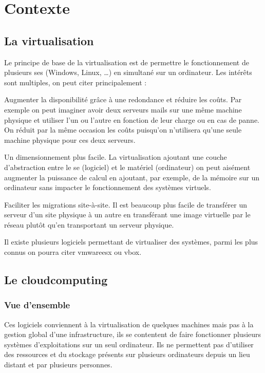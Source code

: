 \documentclass[a4paper,oneside]{report}
\begin{document}
\section{Contexte}
\subsection{La \gls{virtualisation}}
Le principe de base de la \gls{virtualisation} est de permettre le fonctionnement de plusieurs \glspl{se} (Windows, Linux, …) en simultané sur un ordinateur.
Les intérêts sont multiples, on peut citer principalement :\newline

Augmenter la disponibilité grâce à une redondance et réduire les coûts.
Par exemple on peut imaginer avoir deux serveurs mails sur une même machine physique et utiliser l’un ou l’autre en fonction de leur charge ou en cas de panne.
On réduit par la même occasion les coûts puisqu’on n’utilisera qu’une seule machine physique pour ces deux serveurs.

Un dimensionnement plus facile. La \gls{virtualisation} ajoutant une couche d’abstraction entre le \gls{se} (logiciel) et le matériel (ordinateur) on peut aisément augmenter la puissance de calcul en ajoutant, par exemple, de la mémoire sur un ordinateur sans impacter le fonctionnement des systèmes virtuels.

Faciliter les migrations site-à-site.
Il est beaucoup plus facile de transférer un serveur d’un site physique à un autre en transférant une image virtuelle par le réseau plutôt qu’en transportant un serveur physique.\newline

Il existe plusieurs logiciels permettant de virtualiser des systèmes, parmi les plus connus on pourra citer \gls{vmwareesx} ou \gls{vbox}.

\subsection{Le \gls{cloudcomputing}}
\subsubsection{Vue d'ensemble}
Ces logiciels conviennent à la \gls{virtualisation} de quelques machines mais pas à la gestion global d'une infrastructure, ils se contentent de faire fonctionner plusieurs systèmes d’exploitations sur un seul ordinateur.
Ils ne permettent pas d'utiliser des ressources et du stockage présents sur plusieurs ordinateurs depuis un lieu distant et par plusieurs personnes.
\end{document}
